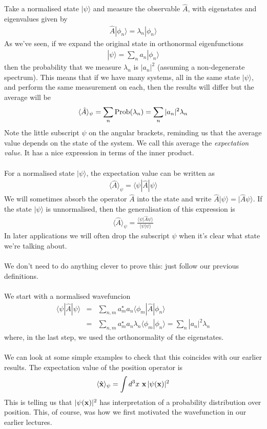 \documentclass[12pt]{article}
\def\be{\begin{eqnarray}}
\def\ee{\end{eqnarray}}
\newcommand{\nn}{\nonumber}
\newcommand\para{\paragraph{}}
\newcommand{\ket}[1]{|#1\rangle}
\newcommand{\bra}[1]{\langle#1|}
\newcommand{\co}{\color{olive}}
\newcommand{\bx}{{\bf x}}
\begin{document}
{{\co Take a normalised state $\ket{\psi}$ and measure the observable $\hat{A}$, with eigenstates and eigenvalues given by
%
\be \hat{A} \ket{\phi_n} = \lambda_n\ket{\phi_n}\nn\ee
%
As we've seen, if we expand the original state in orthonormal eigenfunctions 
%
\be \ket{\psi} = \sum_{n} a_n\ket{\phi_n}\nn\ee
%
then the probability that we measure $\lambda_n$ is $|a_n|^2$ (assuming a non-degenerate spectrum). This means that if we have many systems, all in the same state $\ket{\psi}$, and perform the same measurement on each, then the results will differ but the average will be
%
\be \langle \hat{A}\rangle_\psi =  \sum_n {\rm Prob}(\lambda_n) = \sum_n |a_n|^2 \lambda_n \nn\ee
%
}
Note the little subscript $\psi$ on the angular brackets, reminding us that the average value depends on the state of the system. We call this average the {\it expectation value}. It has a nice expression in terms of the inner product.
%
\\ {\ } \\ 
%
{\co {\bf Claim:} For a normalised state $\ket{\psi}$, the expectation value can be written as 
%
\be \langle\hat{A}\rangle_\psi = \bra{\psi}\hat{A}\ket{\psi}\nn\ee
%
We will sometimes absorb the operator $\hat{A}$ into the state and write $\hat{A}\ket{\psi}= \ket{\hat{A}\psi}$. If the state $\ket{\psi}$ is unnormalised, then the generalisation of this expression is 
%
\be \langle\hat{A}\rangle_\psi = \frac{\bra{\psi}{\hat{A}\psi}\rangle}{\bra{\psi}{\psi}\rangle}\nn\ee
%
}
In later applications we will often drop the subscript $\psi$ when it's clear what state we're talking about.


\para
We don't need to do anything clever to prove this: just follow our previous definitions. 

\para
{\co {\bf Proof:} We start with a normalised wavefuncion
%
\be \bra{\psi}\hat{A}\ket{\psi} &=& \sum_{n,m}a_m^\star a_n\bra{\phi_m}\hat{A}\ket{\phi_n}\nn\\ &=&\sum_{n,m}a_m^\star a_n \lambda_n \bra{\phi_m}{\phi_n}\rangle = \sum_n|a_n|^2\lambda_n\nn \ee
%
}
where, in the last step, we used the orthonormality of the eigenstates.



\para
{\co  We can look at some simple examples to check that this coincides with our earlier results. The expectation value of the position operator is
%
\be \langle\hat{\bx}\rangle_\psi = \int d^3x\ \bx\,|\psi(\bx)|^2\nn\ee
%
}
This is telling us that  $|\psi(\bx)|^2$ has interpretation of a probability distribution over position. This, of course, was how we first motivated the wavefunction in our earlier lectures. 

}
\end{document}
